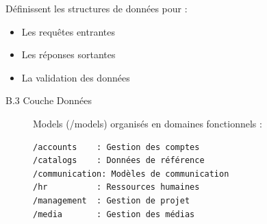 {\begin{enumerate}
\begin{description}
\begin{description}
\begin{description}
                        \vspace{0.35cm}
                        \item[- DTOs (/dtos)]
        
                            Définissent les structures de données pour :
                            
                            \begin{itemize}
                                \item Les requêtes entrantes
                                \item Les réponses sortantes
                                \item La validation des données
                            \end{itemize}
                    
                    \end{description}
                \end{description}  
            
            \begin{description}
                \item[B.3 Couche Données] 

                Models (/models) organisés en domaines fonctionnels :

                \begin{verbatim}
/accounts    : Gestion des comptes
/catalogs    : Données de référence
/communication: Modèles de communication
/hr          : Ressources humaines
/management  : Gestion de projet
/media       : Gestion des médias
                \end{verbatim}
            \end{description}
            

\end{description}
\end{enumerate}}
